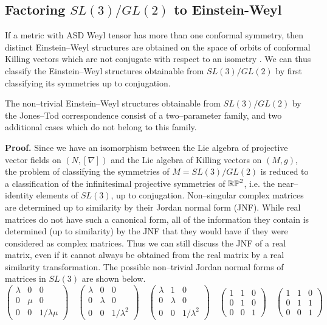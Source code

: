 \subsection{Factoring $SL(3)/GL(2)$ to Einstein-Weyl}
\label{neat2}
If a metric with ASD Weyl tensor has more than one conformal symmetry, then distinct Einstein--Weyl structures are obtained on the space of orbits of conformal Killing vectors which are not conjugate with respect to an isometry \cite{PT}. We can thus classify the Einstein--Weyl structures obtainable from $SL(3)/GL(2)$ by first classifying its symmetries up to conjugation.
\begin{prop}
The non--trivial Einstein--Weyl structures obtainable from $SL(3)/GL(2)$ by the Jones--Tod correspondence consist of a two--parameter family, and two additional cases which do not belong to this family.
\end{prop}
\noindent
{\bf Proof. }Since we have an isomorphism between the Lie algebra of projective vector fields on $(N,[\nabla])$ and the Lie algebra of Killing vectors on $(M,g)$, the problem of classifying the symmetries of $M=SL(3)/GL(2)$ is reduced to a classification of the infinitesimal  projective symmetries of $\mathbb{RP}^2$, i.e. the near--identity elements of $SL(3)$, up to conjugation. Non--singular complex matrices are determined up to similarity by their Jordan normal form (JNF). While real matrices do not have such a canonical form, all of the information they contain is determined (up to similarity) by the JNF that they would have if they were considered as complex matrices. Thus we can still discuss the JNF of a real matrix, even if it cannot always be obtained from the real matrix by a real similarity transformation. The possible non--trivial Jordan normal forms of matrices in $SL(3)$ are shown below.
\[
\begin{pmatrix}\lambda & 0 & 0\\
0 & \mu & 0\\
0 & 0 & 1/\lambda\mu
\end{pmatrix}
\quad
\begin{pmatrix}\lambda & 0 & 0\\
0 & \lambda & 0\\
0 & 0 & 1/\lambda^2
\end{pmatrix}
\quad
\begin{pmatrix}\lambda & 1 & 0\\
0 & \lambda & 0\\
0 & 0 & 1/\lambda^2
\end{pmatrix}
\quad
\begin{pmatrix}1 & 1 & 0\\
0 & 1 & 0\\
0 & 0 & 1
\end{pmatrix}
\quad
\begin{pmatrix}1 & 1 & 0\\
0 & 1 & 1\\
0 & 0 & 1
\end{pmatrix}
\]

